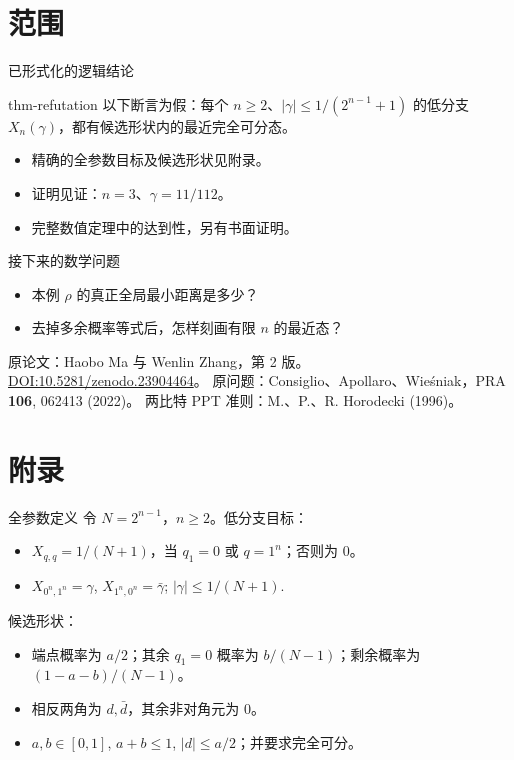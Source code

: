 \documentclass{beamer}
\begin{document}
\section{范围}
\begin{frame}{已形式化的逻辑结论}
\begin{bookresult}{thm-refutation}
以下断言为假：每个 $n\ge2$、$|\gamma|\le1/(2^{n-1}+1)$ 的低分支 $X_n(\gamma)$，都有候选形状内的最近完全可分态。
\end{bookresult}
\begin{itemize}
\item 精确的全参数目标及候选形状见附录。
\item 证明见证：$n=3$、$\gamma=11/112$。
\item 完整数值定理中的达到性，另有书面证明。
\end{itemize}
\end{frame}
\begin{frame}{接下来的数学问题}
\begin{itemize}
\item 本例 $\rho$ 的真正全局最小距离是多少？
\item 去掉多余概率等式后，怎样刻画有限 $n$ 的最近态？
\end{itemize}
\medskip
原论文：Haobo Ma 与 Wenlin Zhang，第 2 版。
\href{https://doi.org/10.5281/zenodo.23904464}{DOI:10.5281/zenodo.23904464}。
\medskip
原问题：Consiglio、Apollaro、Wieśniak，PRA \textbf{106}, 062413 (2022)。
\medskip
两比特 PPT 准则：M.、P.、R. Horodecki (1996)。
\end{frame}
\appendix
\section{附录}
\begin{frame}{全参数定义}
令 $N=2^{n-1}$，$n\ge2$。低分支目标：
\begin{itemize}
\item $X_{q,q}=1/(N+1)$，当 $q_1=0$ 或 $q=1^n$；否则为 $0$。
\item $X_{0^n,1^n}=\gamma$, $X_{1^n,0^n}=\bar\gamma$; $|\gamma|\le1/(N+1)$.
\end{itemize}
候选形状：
\begin{itemize}
\item 端点概率为 $a/2$；其余 $q_1=0$ 概率为 $b/(N-1)$；剩余概率为 $(1-a-b)/(N-1)$。
\item 相反两角为 $d,\bar d$，其余非对角元为 $0$。
\item $a,b\in[0,1]$, $a+b\le1$, $|d|\le a/2$；并要求完全可分。
\end{itemize}
\end{frame}
\FormalVerification
\end{document}

